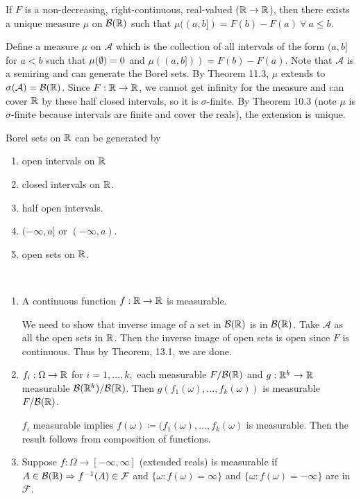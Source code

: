 \documentclass[class=article,crop=false]{standalone}
\begin{document}
\begin{thm}[12.4]
	If $ F$ is a non-decreasing, right-continuous, real-valued ($ \mathbb{R} \to \mathbb{R}$), then there exists a unique measure $ \mu$ on $ \mathcal{B}(\mathbb{R})$ such that $ \mu((a,b])= F(b) - F(a) \ \forall \ a \leq b$. 
\end{thm}

\begin{prf}
	Define a measure $ \mu$ on $ \mathcal{A}$ which is the collection of all intervals of the form $ (a,b]$ for  $ a<b$  such that $ \mu( \emptyset) = 0$ and $ \mu((a,b]))= F(b)-F(a)$. Note that $ \mathcal{A}$ is a semiring and can generate the Borel sets. By Theorem 11.3, $ \mu$ extends to $ \sigma(\mathcal{A})= \mathcal{B}(\mathbb{R})$. Since $ F: \mathbb{R} \to \mathbb{R}$, we cannot get infinity for the measure and can cover $ \mathbb{R}$ by these half closed intervals, so it is $ \sigma$-finite. By Theorem 10.3 (note $ \mu$ is $\sigma$-finite because intervals are finite and cover the reals), the extension is unique.
\end{prf}

\begin{note}[]
Borel sets on $ \mathbb{R}$ can be generated by
\begin{enumerate}[label=\arabic*)]
	\item open intervals on $ \mathbb{R}$ 
	\item closed intervals on $ \mathbb{R}$.
	\item half open intervals.
	\item $ (-\infty,a]$ or $ (-\infty,a)$.
	\item open sets on $ \mathbb{R}$.
\end{enumerate}
\end{note}

\begin{claim}[]
~\begin{enumerate}[label=\arabic*)]
	\item A continuous function $ f: \mathbb{R} \to \mathbb{R}$ is measurable.
		\begin{prf}
			We need to show that inverse image of a set in $ \mathcal{B}(\mathbb{R})$ is in $ \mathcal{B}(\mathbb{R})$. Take $ \mathcal{A}$ as all the open sets in $ \mathbb{R}$. Then the inverse image of open sets is open since $ F$ is continuous. Thus by Theorem, 13.1, we are done.
		\end{prf}
	\item $ f_i: \Omega \to \mathbb{R}$ for $ i=1,\ldots,k,$ each measurable $ F / \mathcal{B}(\mathbb{R})$ and $ g: \mathbb{R}^{k} \to \mathbb{R}$ measurable $ \mathcal{B}(\mathbb{R}^{k}) / \mathcal{B}(\mathbb{R})$. Then $ g(f_1(\omega),\ldots,f_k(\omega))$ is measurable $ F / \mathcal{B}(\mathbb{R})$.
		\begin{prf}
			$  f_i$ measurable implies $ f(\omega) \coloneqq (f_1(\omega),\ldots,f_k(\omega)$ is measurable. Then the result follows from composition of functions.
		\end{prf}
	\item Suppose $ f: \Omega \to  [-\infty,\infty]$ (extended reals) is measurable if $ A \in \mathcal{B}(\mathbb{R}) \Rightarrow f^{-1}(A) \in \mathcal{F}$ and $ \{\omega: f(\omega)=\infty\} $ and $ \{\omega: f(\omega) = -\infty\} $ are in $ \mathcal{F}$.
\end{enumerate}
\end{claim}
\end{document}
